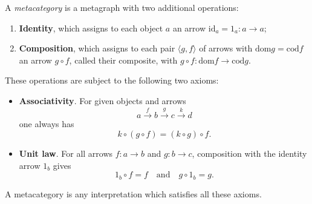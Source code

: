A \emph{metacategory} is a metagraph with two additional operations:

\begin{enumerate}
\item \textbf{Identity}, which assigns to each object $a$ an arrow $\text{id}_a = 1_a: a \rightarrow a$;
\item \textbf{Composition}, which assigns to each pair $\langle g, f \rangle$ of arrows with $\text{dom} g = \text{cod} f$ an arrow $g \circ f$, called their composite, with $g \circ f: \text{dom} f \rightarrow \text{cod} g$.
\end{enumerate}

These operations are subject to the following two axioms:

\begin{itemize}
\item \textbf{Associativity}. For given objects and arrows
$$a \xrightarrow{f} b \xrightarrow{g} c \xrightarrow{k} d$$
one always has
$$k \circ (g \circ f) = (k \circ g) \circ f.$$

\item \textbf{Unit law}. For all arrows $f: a \rightarrow b$ and $g: b \rightarrow c$, composition with the identity arrow $1_b$ gives
$$1_b \circ f = f \quad \text{and} \quad g \circ 1_b = g.$$
\end{itemize}

A metacategory is any interpretation which satisfies all these axioms.
